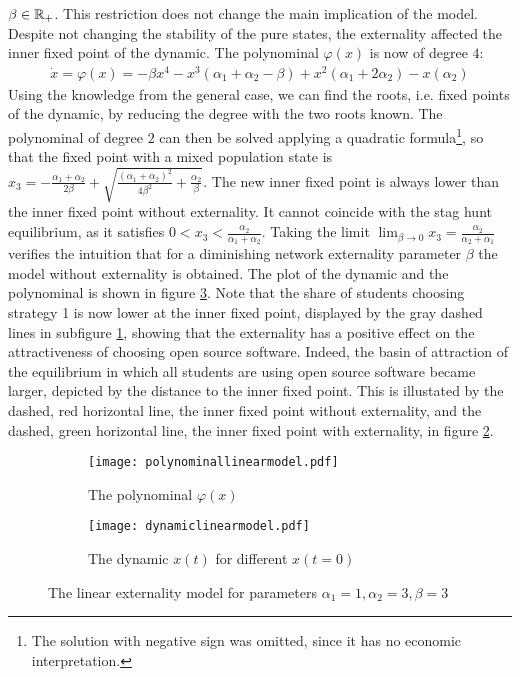 $\beta \in \mathbb{R}_+$. This restriction does not change the main implication
of the model. 
Despite not changing the stability of the pure states, 
the externality affected the inner fixed point of the dynamic.
The polynominal $\varphi(x)$ is now of degree $4$:
\begin{align}
        \dot{x} = \varphi(x) = -\beta x^4 -x^3(\alpha_1 + \alpha_2 
        - \beta ) + x^2 (\alpha_1 + 2 \alpha_2) - x(\alpha_2)
\end{align}
Using the knowledge from the general case, we can find the roots, i.e. fixed
points of the dynamic, by reducing the degree with the two roots known. The
polynominal of degree $2$ can then be solved applying a quadratic formula\footnote{
The solution with negative sign was omitted, since it has no economic 
interpretation.}, so that the fixed point with a mixed population state is
$x_3 = -\frac{\alpha_1+\alpha_2}{2 \beta} + 
\sqrt{\frac{(\alpha_1+\alpha_2)^2}{4\beta^2} +\frac{\alpha_2}{\beta}}$. 
The new inner fixed point is always lower than the inner fixed point without 
externality. It cannot coincide with the stag hunt equilibrium, as it 
satisfies $0<x_3<\frac{\alpha_2}{\alpha_1+\alpha_2}$. 
Taking the limit $\lim_{\beta \rightarrow 0} x_3 = 
\frac{\alpha_2}{\alpha_2+\alpha_1}$ verifies the intuition that for a 
diminishing network externality parameter $\beta$ the model without 
externality is obtained.
The plot of the dynamic and the polynominal is 
shown in figure \ref{fig:plotmodellinear}.
Note that the share of students choosing strategy 1 is now lower at the 
inner fixed point, displayed by the gray dashed lines in subfigure 
\ref{fig:externalitypolynominal}, showing that the externality has a positive 
effect on the attractiveness of choosing open source software. 
Indeed, the basin of attraction of the equilibrium in which all 
students are using open source software became larger, 
depicted by the distance to the inner fixed point.
This is illustated by the dashed, red horizontal line, 
the inner fixed point without externality, and the dashed, green horizontal 
line, the inner fixed point with externality, 
in figure \ref{fig:dynamiclinear}.
\begin{figure}[h]
        \centering
        \begin{subfigure}{.5\textwidth}
        \centering
        \texttt{[image: polynominallinearmodel.pdf]}
        \caption[Polynominal of the externality model]{The polynominal $\varphi(x)$} 
        \label{fig:externalitypolynominal}
        \end{subfigure}%
        \begin{subfigure}{.5\textwidth}
        \centering
        \texttt{[image: dynamiclinearmodel.pdf]}
        \caption[Replicator dynamic of the model with externality]{The dynamic $x(t)$ for different $x(t=0)$} 
        \label{fig:dynamiclinear}
        \end{subfigure}%
        \caption[Polynominal and Dynamic of the model with externality]
        {The linear externality 
                model for parameters $\alpha_1=1,\alpha_2=3,\beta=3$}
        \label{fig:plotmodellinear}
\end{figure}
